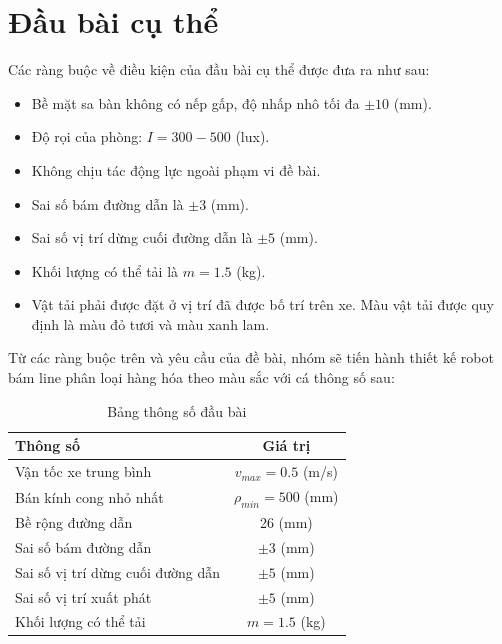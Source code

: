     \section{Đầu bài cụ thể}
        \hspace*{0.6cm}Các ràng buộc về điều kiện của đầu bài cụ thể được đưa ra như sau:
        \begin{itemize}
            \item Bề mặt sa bàn không có nếp gấp, độ nhấp nhô tối đa $\pm 10$ (mm).
            \item Độ rọi của phòng: $I = 300 - 500$ (lux).
            \item Không chịu tác động lực ngoài phạm vi đề bài.
            \item Sai số bám đường dẫn là $\pm 3$ (mm).
            \item Sai số vị trí dừng cuối đường dẫn là $\pm 5$ (mm).
            \item Khối lượng có thể tải là $m = 1.5$ (kg).
            \item Vật tải phải được đặt ở vị trí đã được bố trí trên xe. Màu vật tải được quy định là màu đỏ tươi và màu xanh lam.
        \end{itemize}
        \hspace*{0.6cm}Từ các ràng buộc trên và yêu cầu của đề bài, nhóm sẽ tiến hành thiết kế robot bám line phân loại hàng hóa theo màu sắc với cá thông số sau:
        \begin{table}[H]
            \centering
            \caption{Bảng thông số đầu bài}
            \begin{tabular}{|l|c|}
            \hline
            \centering \textbf{Thông số} & \textbf{Giá trị} \\
            \hline
            Vận tốc xe trung bình & $v_{max} = 0.5$ (m/s) \\
            \hline
            Bán kính cong nhỏ nhất & $\rho_{min} = 500$ (mm) \\
            \hline
            Bề rộng đường dẫn & 26 (mm) \\
            \hline
            Sai số bám đường dẫn & $\pm 3$ (mm) \\
            \hline
            Sai số vị trí dừng cuối đường dẫn & $\pm 5$ (mm) \\
            \hline
            Sai số vị trí xuất phát & $\pm 5$ (mm) \\
            \hline
            Khối lượng có thể tải & $m = 1.5$ (kg) \\
            \hline
            \end{tabular}
        \end{table}





    